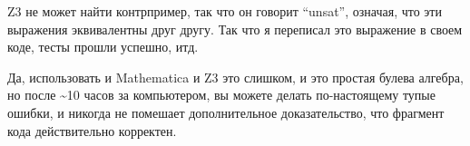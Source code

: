 Z3 не может найти контрпример, так что он говорит ``unsat'', означая, что эти выражения эквивалентны друг другу.
Так что я переписал это выражение в своем коде, тесты прошли успешно, итд.

Да, использовать и Mathematica и Z3 это слишком, и это простая булева алгебра,
но после \textasciitilde{}10 часов за компьютером, вы можете делать по-настоящему тупые ошибки,
и никогда не помешает дополнительное доказательство, что фрагмент кода действительно корректен.

